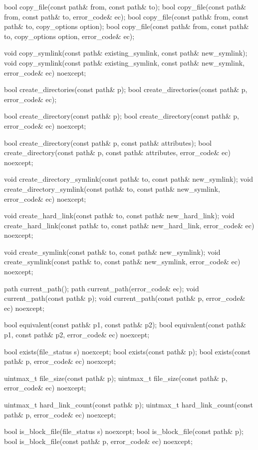 \begin{codeblock}
{  bool copy_file(const path& from, const path& to);
  bool copy_file(const path& from, const path& to, error_code& ec);
  bool copy_file(const path& from, const path& to, copy_options option);
  bool copy_file(const path& from, const path& to, copy_options option,
                 error_code& ec);

  void copy_symlink(const path& existing_symlink, const path& new_symlink);
  void copy_symlink(const path& existing_symlink, const path& new_symlink,
                    error_code& ec) noexcept;

  bool create_directories(const path& p);
  bool create_directories(const path& p, error_code& ec);

  bool create_directory(const path& p);
  bool create_directory(const path& p, error_code& ec) noexcept;

  bool create_directory(const path& p, const path& attributes);
  bool create_directory(const path& p, const path& attributes,
                        error_code& ec) noexcept;

  void create_directory_symlink(const path& to, const path& new_symlink);
  void create_directory_symlink(const path& to, const path& new_symlink,
                                error_code& ec) noexcept;

  void create_hard_link(const path& to, const path& new_hard_link);
  void create_hard_link(const path& to, const path& new_hard_link,
                        error_code& ec) noexcept;

  void create_symlink(const path& to, const path& new_symlink);
  void create_symlink(const path& to, const path& new_symlink,
                      error_code& ec) noexcept;

  path current_path();
  path current_path(error_code& ec);
  void current_path(const path& p);
  void current_path(const path& p, error_code& ec) noexcept;

  bool equivalent(const path& p1, const path& p2);
  bool equivalent(const path& p1, const path& p2, error_code& ec) noexcept;

  bool exists(file_status s) noexcept;
  bool exists(const path& p);
  bool exists(const path& p, error_code& ec) noexcept;

  uintmax_t file_size(const path& p);
  uintmax_t file_size(const path& p, error_code& ec) noexcept;

  uintmax_t hard_link_count(const path& p);
  uintmax_t hard_link_count(const path& p, error_code& ec) noexcept;

  bool is_block_file(file_status s) noexcept;
  bool is_block_file(const path& p);
  bool is_block_file(const path& p, error_code& ec) noexcept;

}
\end{codeblock}
